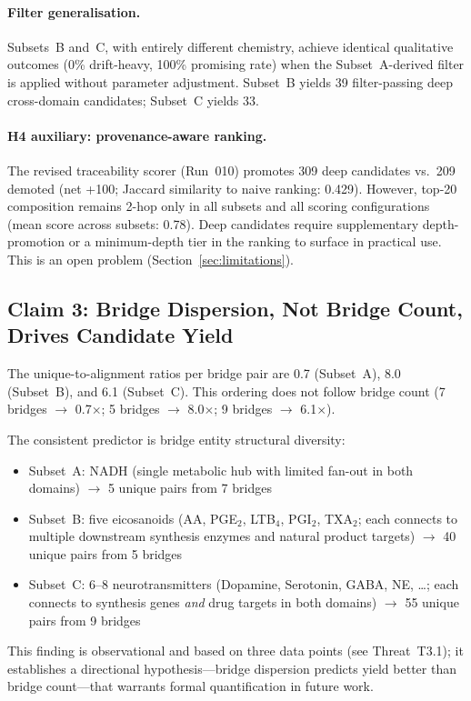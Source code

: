 \paragraph{Filter generalisation.}
Subsets~B and~C, with entirely different chemistry, achieve identical qualitative
outcomes (0\% drift-heavy, 100\% promising rate) when the Subset~A-derived filter
is applied without parameter adjustment.
Subset~B yields 39 filter-passing deep cross-domain candidates;
Subset~C yields 33.

\paragraph{H4 auxiliary: provenance-aware ranking.}
The revised traceability scorer (Run~010) promotes 309 deep candidates
vs.\ 209 demoted (net +100; Jaccard similarity to naive ranking: 0.429).
However, top-20 composition remains 2-hop only in all subsets and all
scoring configurations (mean score across subsets: 0.78).
Deep candidates require supplementary depth-promotion or a minimum-depth
tier in the ranking to surface in practical use.
This is an open problem (Section~\ref{sec:limitations}).

\subsection{Claim 3: Bridge Dispersion, Not Bridge Count, Drives Candidate Yield}
\label{sec:result-c3}

The unique-to-alignment ratios per bridge pair are 0.7 (Subset~A), 8.0 (Subset~B),
and 6.1 (Subset~C).
This ordering does not follow bridge count (7 bridges $\to$ 0.7$\times$;
5 bridges $\to$ 8.0$\times$; 9 bridges $\to$ 6.1$\times$).

The consistent predictor is bridge entity structural diversity:
\begin{itemize}[noitemsep]
  \item Subset~A: NADH (single metabolic hub with limited fan-out in both domains)
    $\to$ 5 unique pairs from 7 bridges
  \item Subset~B: five eicosanoids (AA, PGE$_2$, LTB$_4$, PGI$_2$, TXA$_2$;
    each connects to multiple downstream synthesis enzymes and natural product targets)
    $\to$ 40 unique pairs from 5 bridges
  \item Subset~C: 6--8 neurotransmitters (Dopamine, Serotonin, GABA, NE, \ldots;
    each connects to synthesis genes \textit{and} drug targets in both domains)
    $\to$ 55 unique pairs from 9 bridges
\end{itemize}

This finding is observational and based on three data points (see Threat~T3.1);
it establishes a directional hypothesis---bridge dispersion predicts yield
better than bridge count---that warrants formal quantification in future work.
